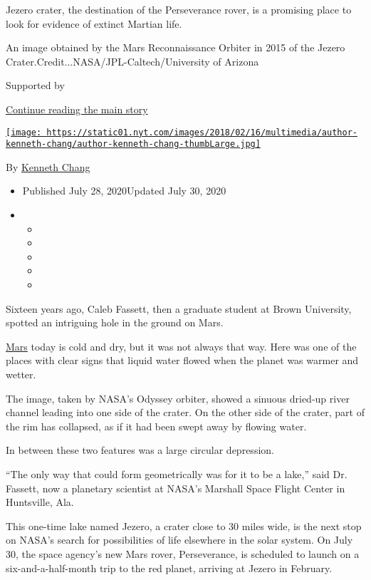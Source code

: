 Jezero crater, the destination of the Perseverance rover, is a promising
place to look for evidence of extinct Martian life.

An image obtained by the Mars Reconnaissance Orbiter in 2015 of the
Jezero Crater.Credit...NASA/JPL-Caltech/University of Arizona

Supported by

\protect\hyperlink{after-sponsor}{Continue reading the main story}

\href{https://www.nytimes.com/by/kenneth-chang}{\texttt{[image: https://static01.nyt.com/images/2018/02/16/multimedia/author-kenneth-chang/author-kenneth-chang-thumbLarge.jpg]}}

By \href{https://www.nytimes.com/by/kenneth-chang}{Kenneth Chang}

\begin{itemize}
\item
  Published July 28, 2020Updated July 30, 2020
\item
  \begin{itemize}
  \item
  \item
  \item
  \item
  \item
  \end{itemize}
\end{itemize}

Sixteen years ago, Caleb Fassett, then a graduate student at Brown
University, spotted an intriguing hole in the ground on Mars.

\href{https://www.nytimes.com/2020/07/30/science/nasa-mars-launch.html}{Mars}
today is cold and dry, but it was not always that way. Here was one of
the places with clear signs that liquid water flowed when the planet was
warmer and wetter.

The image, taken by NASA's Odyssey orbiter, showed a sinuous dried-up
river channel leading into one side of the crater. On the other side of
the crater, part of the rim has collapsed, as if it had been swept away
by flowing water.

In between these two features was a large circular depression.

``The only way that could form geometrically was for it to be a lake,''
said Dr. Fassett, now a planetary scientist at NASA's Marshall Space
Flight Center in Huntsville, Ala.

This one-time lake named Jezero, a crater close to 30 miles wide, is the
next stop on NASA's search for possibilities of life elsewhere in the
solar system. On July 30, the space agency's new Mars rover,
Perseverance, is scheduled to launch on a six-and-a-half-month trip to
the red planet, arriving at Jezero in February.

